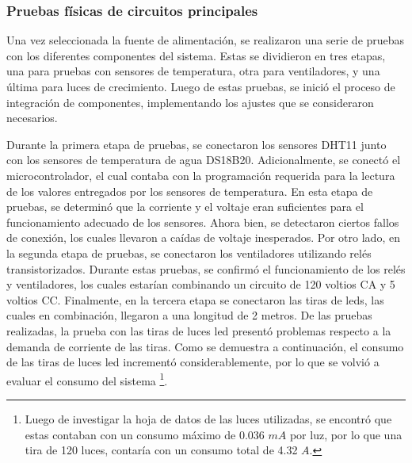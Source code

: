 \subsubsection{Pruebas físicas de circuitos principales}

Una vez seleccionada la fuente de alimentación, se realizaron una serie de pruebas con los diferentes componentes del sistema. Estas se dividieron en tres etapas, una para pruebas con sensores de temperatura, otra para ventiladores, y una última para luces de crecimiento. Luego de estas pruebas, se inició el proceso de integración de componentes, implementando los ajustes que se consideraron necesarios.

Durante la primera etapa de pruebas, se conectaron los sensores DHT11 junto con los sensores de temperatura de agua DS18B20. Adicionalmente, se conectó el microcontrolador, el cual contaba con la programación requerida para la lectura de los valores entregados por los sensores de temperatura. En esta etapa de pruebas, se determinó que la corriente y el voltaje eran suficientes para el funcionamiento adecuado de los sensores. Ahora bien, se detectaron ciertos fallos de conexión, los cuales llevaron a caídas de voltaje inesperados. Por otro lado, en la segunda etapa de pruebas, se conectaron los ventiladores utilizando relés transistorizados. Durante estas pruebas, se confirmó el funcionamiento de los relés y ventiladores, los cuales estarían combinando un circuito de 120 voltios CA y 5 voltios CC. Finalmente, en la tercera etapa se conectaron las tiras de leds, las cuales en combinación, llegaron a una longitud de 2 metros. De las pruebas realizadas, la prueba con las tiras de luces led presentó problemas respecto a la demanda de corriente de las tiras. Como se demuestra a continuación, el consumo de las tiras de luces led incrementó considerablemente, por lo que se volvió a evaluar el consumo del sistema \footnote{Luego de investigar la hoja de datos de las luces utilizadas, se encontró que estas contaban con un consumo máximo de 0.036 $mA$ por luz, por lo que una tira de 120 luces, contaría con un consumo total de 4.32 $A$.}.

